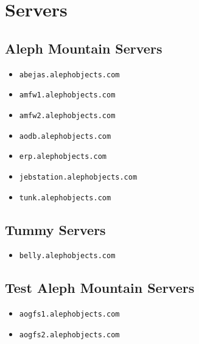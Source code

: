 %
%
%
%
%

\section{Servers}

\subsection{Aleph Mountain Servers}
\begin{itemize}
\item \texttt{abejas.alephobjects.com}
\item \texttt{amfw1.alephobjects.com}
\item \texttt{amfw2.alephobjects.com}
\item \texttt{aodb.alephobjects.com}
\item \texttt{erp.alephobjects.com}
\item \texttt{jebstation.alephobjects.com}
\item \texttt{tunk.alephobjects.com}
\end{itemize}

\subsection{Tummy Servers}
\begin{itemize}
\item \texttt{belly.alephobjects.com}
\end{itemize}

\subsection{Test Aleph Mountain Servers}
\begin{itemize}
\item \texttt{aogfs1.alephobjects.com}
\item \texttt{aogfs2.alephobjects.com}
\end{itemize}

